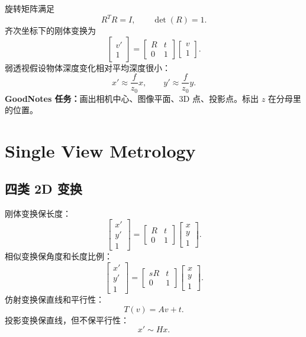 \documentclass[11pt]{article}
\newcommand{\goodnotes}[1]{\textbf{GoodNotes 任务：}#1}
\begin{document}
旋转矩阵满足
\[
  R^TR=I,\qquad \det(R)=1.
\]
齐次坐标下的刚体变换为
\[
  \begin{bmatrix}
    v'\\1
  \end{bmatrix}
  =
  \begin{bmatrix}
    R&t\\0&1
  \end{bmatrix}
  \begin{bmatrix}
    v\\1
  \end{bmatrix}.
\]
弱透视假设物体深度变化相对平均深度很小：
\[
  x' \approx \frac{f}{z_0}x,\qquad y' \approx \frac{f}{z_0}y.
\]
\goodnotes{画出相机中心、图像平面、3D 点、投影点。标出 $z$ 在分母里的位置。}

\section{Single View Metrology}

\subsection{四类 2D 变换}

刚体变换保长度：
\[
  \begin{bmatrix}
    x'\\y'\\1
  \end{bmatrix}
  =
  \begin{bmatrix}
    R&t\\0&1
  \end{bmatrix}
  \begin{bmatrix}
    x\\y\\1
  \end{bmatrix}.
\]
相似变换保角度和长度比例：
\[
  \begin{bmatrix}
    x'\\y'\\1
  \end{bmatrix}
  =
  \begin{bmatrix}
    sR&t\\0&1
  \end{bmatrix}
  \begin{bmatrix}
    x\\y\\1
  \end{bmatrix}.
\]
仿射变换保直线和平行性：
\[
  T(v)=Av+t.
\]
投影变换保直线，但不保平行性：
\[
  x' \sim Hx.
\]
\end{document}
